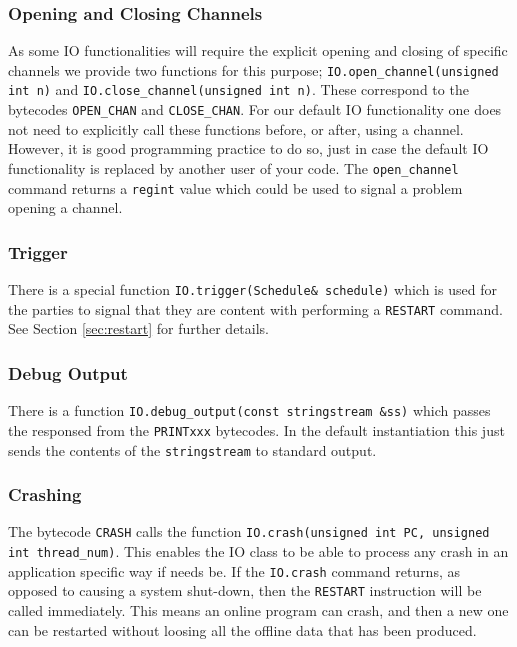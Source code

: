 \subsubsection{Opening and Closing Channels}
As some IO functionalities will require the explicit opening
and closing of specific channels we provide two functions
for this purpose;
\verb+IO.open_channel(unsigned int n)+
and
\verb+IO.close_channel(unsigned int n)+.
These correspond to the bytecodes \verb+OPEN_CHAN+ and
\verb+CLOSE_CHAN+.
For our default IO functionality one does not need to
explicitly call these functions before, or after,
using a channel.
However, it is good programming practice to do so, just
in case the default IO functionality is replaced by another
user of your code.
The \verb+open_channel+ command returns a \verb+regint+
value which could be used to signal a problem opening a channel.

\subsubsection{Trigger}
There is a special function \verb+IO.trigger(Schedule& schedule)+ 
which is used for the parties to signal that they are content with
performing a \verb+RESTART+ command.
See Section \ref{sec:restart} for further details.

\subsubsection{Debug Output}
There is a function \verb+IO.debug_output(const stringstream &ss)+
which passes the responsed from the \verb+PRINTxxx+ bytecodes.
In the default instantiation this just sends the contents
of the \verb+stringstream+ to standard output.

\subsubsection{Crashing}
The bytecode \verb+CRASH+ calls the function 
\verb+IO.crash(unsigned int PC, unsigned int thread_num)+.
This enables the IO class to be able to process any crash
in an application specific way if needs be.
If the \verb+IO.crash+ command returns, as opposed to causing
a system shut-down, then the \verb+RESTART+ instruction will
be called immediately.
This means an online program can crash, and then a new one
can be restarted without loosing all the offline data that
has been produced.

